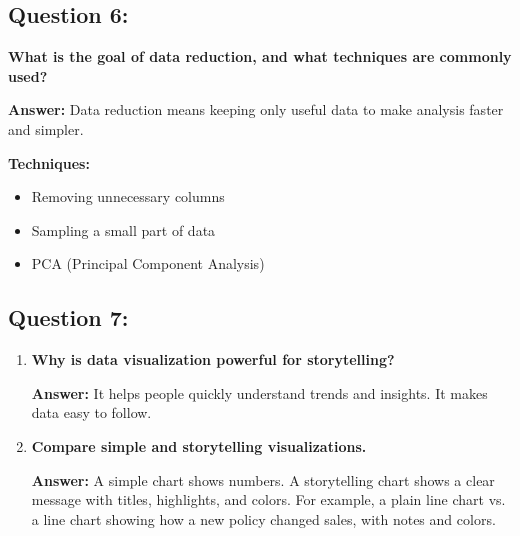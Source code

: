 \documentclass{article}
\begin{document}
\subsection*{Question 6:}
\textbf{What is the goal of data reduction, and what techniques are commonly used?}

\textbf{Answer:} Data reduction means keeping only useful data to make analysis faster and simpler.

\textbf{Techniques:}
\begin{itemize}
    \item Removing unnecessary columns
    \item Sampling a small part of data
    \item PCA (Principal Component Analysis)
\end{itemize}

\subsection*{Question 7:}
\begin{enumerate}[label=(\alph*)]
    \item \textbf{Why is data visualization powerful for storytelling?}

    \textbf{Answer:} It helps people quickly understand trends and insights. It makes data easy to follow.

    \item \textbf{Compare simple and storytelling visualizations.}

    \textbf{Answer:} A simple chart shows numbers. A storytelling chart shows a clear message with titles, highlights, and colors. For example, a plain line chart vs. a line chart showing how a new policy changed sales, with notes and colors.
\end{enumerate}
\end{document}
